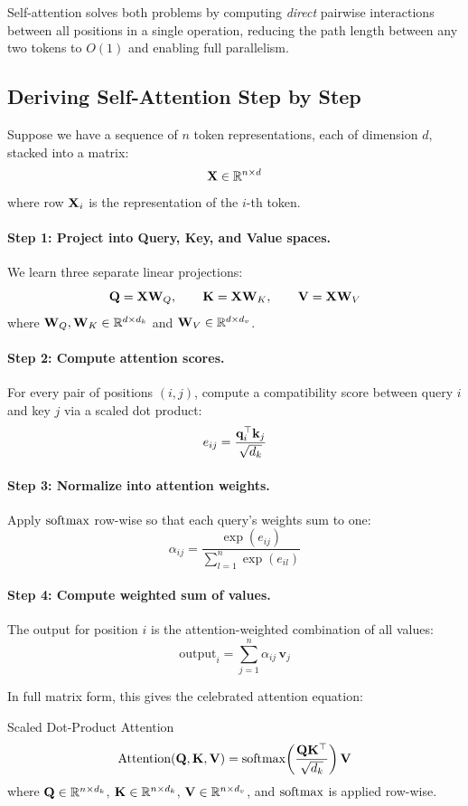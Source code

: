 Self-attention solves both problems by computing \emph{direct} pairwise
interactions between all positions in a single operation, reducing the path
length between any two tokens to $O(1)$ and enabling full parallelism.

\subsection{Deriving Self-Attention Step by Step}

Suppose we have a sequence of $n$ token representations, each of dimension $d$,
stacked into a matrix:
\[
    \mathbf{X} \in \mathbb{R}^{n \times d}
\]
where row $\mathbf{X}_i$ is the representation of the $i$-th token.

\paragraph{Step 1: Project into Query, Key, and Value spaces.}
We learn three separate linear projections:
\[
    \mathbf{Q} = \mathbf{X} \mathbf{W}_Q, \qquad
    \mathbf{K} = \mathbf{X} \mathbf{W}_K, \qquad
    \mathbf{V} = \mathbf{X} \mathbf{W}_V
\]
where $\mathbf{W}_Q, \mathbf{W}_K \in \mathbb{R}^{d \times d_k}$ and $\mathbf{W}_V \in \mathbb{R}^{d \times d_v}$.

\paragraph{Step 2: Compute attention scores.}
For every pair of positions $(i,j)$, compute a compatibility score between
query $i$ and key $j$ via a scaled dot product:
\[
    e_{ij} = \frac{\mathbf{q}_i^\top \mathbf{k}_j}{\sqrt{d_k}}
\]

\paragraph{Step 3: Normalize into attention weights.}
Apply $\operatorname{softmax}$ row-wise so that each query's weights sum to one:
\[
    \alpha_{ij} = \frac{\exp(e_{ij})}{\sum_{l=1}^{n} \exp(e_{il})}
\]

\paragraph{Step 4: Compute weighted sum of values.}
The output for position $i$ is the attention-weighted combination of all values:
\[
    \text{output}_i = \sum_{j=1}^{n} \alpha_{ij}\, \mathbf{v}_j
\]

In full matrix form, this gives the celebrated attention equation:

\begin{mathresult}{Scaled Dot-Product Attention}
\[
    \text{Attention}(\mathbf{Q}, \mathbf{K}, \mathbf{V})
    = \operatorname{softmax}\!\left(\frac{\mathbf{Q} \mathbf{K}^\top}{\sqrt{d_k}}\right) \mathbf{V}
\]
where $\mathbf{Q} \in \mathbb{R}^{n \times d_k}$, $\mathbf{K} \in \mathbb{R}^{n \times d_k}$,
$\mathbf{V} \in \mathbb{R}^{n \times d_v}$, and $\operatorname{softmax}$ is applied row-wise.
\end{mathresult}

